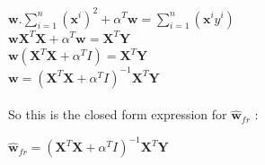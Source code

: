 \documentclass[a4paper,11pt]{article}
\begin{document}
\begin{mlsolution}
\begin{math}
\textbf{w}.\sum_{i=1}^{n} (\textbf{x}^{i})^{2} + \alpha^{T}\textbf{w} = \sum_{i = 1}^{n}\left ( \textbf{x}^{i}y^{i} \right  ) 
\end{math}\\

\begin{math}
\textbf{w}\textbf{X}^{T}\textbf{X} + \alpha^{T}\textbf{w} = \textbf{X}^{T}\textbf{Y}
\end{math}\\

\begin{math}
\textbf{w}\left ( \textbf{X}^{T}\textbf{X} + \alpha^{T}I \right ) = \textbf{X}^{T}\textbf{Y}\end{math}\\

\begin{math}
\textbf{w} = \left ( \textbf{X}^{T}\textbf{X} + \alpha^{T}I \right )^{-1} \textbf{X}^{T}\textbf{Y}
\end{math}\\
\\So this is the closed form expression for \begin{math}\widehat{\textbf{w}}_{fr}\end{math} :

\begin{math}
\widehat{\textbf{w}}_{fr} = \left ( \textbf{X}^{T}\textbf{X} + \alpha^{T}I \right )^{-1} \textbf{X}^{T}\textbf{Y}
\end{math}\\

\end{mlsolution}
\end{document}
